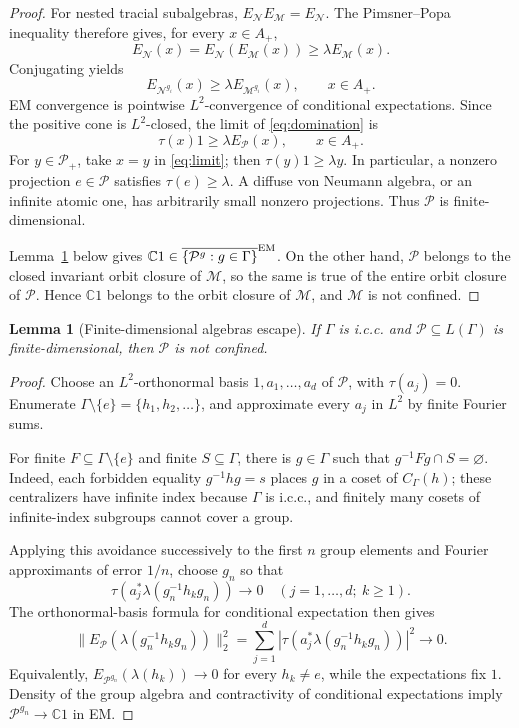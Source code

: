 \documentclass[11pt]{article}
\newtheorem{lemma}{Lemma}
\newcommand{\C}{\mathbb C}
\begin{document}
\begin{proof}
For nested tracial subalgebras,
\(E_{\mathcal N}E_{\mathcal M}=E_{\mathcal N}\). The Pimsner--Popa
inequality therefore gives, for every \(x\in A_+\),
\[
 E_{\mathcal N}(x)
 =E_{\mathcal N}(E_{\mathcal M}(x))
 \geq\lambda E_{\mathcal M}(x).
\]
Conjugating yields
\[
 E_{\mathcal N^{g_i}}(x)\geq
 \lambda E_{\mathcal M^{g_i}}(x),\qquad x\in A_+.
\tag{1}\label{eq:domination}
\]
EM convergence is pointwise \(L^2\)-convergence of conditional expectations.
Since the positive cone is \(L^2\)-closed, the limit of
\eqref{eq:domination} is
\[
 \tau(x)1\geq\lambda E_{\mathcal P}(x),\qquad x\in A_+.
\tag{2}\label{eq:limit}
\]
For \(y\in\mathcal P_+\), take \(x=y\) in \eqref{eq:limit}; then
\(\tau(y)1\geq\lambda y\). In particular, a nonzero projection
\(e\in\mathcal P\) satisfies \(\tau(e)\geq\lambda\). A diffuse von Neumann
algebra, or an infinite atomic one, has arbitrarily small nonzero projections.
Thus \(\mathcal P\) is finite-dimensional.

Lemma~\ref{lem:finite} below gives
\(\C1\in\overline{\{\mathcal P^g:g\in\Gamma\}}^{\rm EM}\). On the other hand,
\(\mathcal P\) belongs to the closed invariant orbit closure of \(\mathcal M\),
so the same is true of the entire orbit closure of \(\mathcal P\). Hence
\(\C1\) belongs to the orbit closure of \(\mathcal M\), and \(\mathcal M\)
is not confined.
\end{proof}

\begin{lemma}[Finite-dimensional algebras escape]\label{lem:finite}
If \(\Gamma\) is i.c.c. and \(\mathcal P\subseteq L(\Gamma)\) is
finite-dimensional, then \(\mathcal P\) is not confined.
\end{lemma}

\begin{proof}
Choose an \(L^2\)-orthonormal basis
\(1,a_1,\ldots,a_d\) of \(\mathcal P\), with \(\tau(a_j)=0\). Enumerate
\(\Gamma\setminus\{e\}=\{h_1,h_2,\ldots\}\), and approximate every \(a_j\)
in \(L^2\) by finite Fourier sums.

For finite \(F\subseteq\Gamma\setminus\{e\}\) and finite
\(S\subseteq\Gamma\), there is \(g\in\Gamma\) such that
\(g^{-1}Fg\cap S=\varnothing\). Indeed, each forbidden equality
\(g^{-1}hg=s\) places \(g\) in a coset of \(C_\Gamma(h)\); these centralizers
have infinite index because \(\Gamma\) is i.c.c., and finitely many cosets of
infinite-index subgroups cannot cover a group.

Applying this avoidance successively to the first \(n\) group elements and
Fourier approximants of error \(1/n\), choose \(g_n\) so that
\[
 \tau(a_j^*\lambda(g_n^{-1}h_kg_n))\longrightarrow0
 \quad(j=1,\ldots,d;\ k\geq1).
\]
The orthonormal-basis formula for conditional expectation then gives
\[
 \|E_{\mathcal P}(\lambda(g_n^{-1}h_kg_n))\|_2^2
 =\sum_{j=1}^d
   |\tau(a_j^*\lambda(g_n^{-1}h_kg_n))|^2\longrightarrow0.
\]
Equivalently,
\(E_{\mathcal P^{g_n}}(\lambda(h_k))\to0\) for every \(h_k\ne e\), while
the expectations fix \(1\). Density of the group algebra and contractivity of
conditional expectations imply \(\mathcal P^{g_n}\to\C1\) in EM.
\end{proof}
\end{document}
